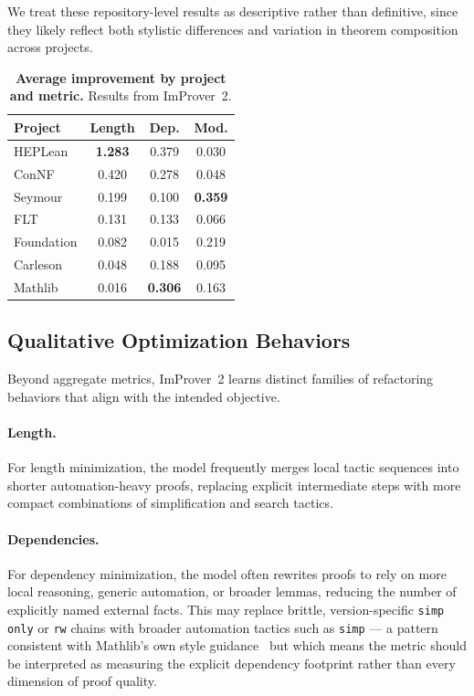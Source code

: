 We treat these repository-level results as descriptive rather than definitive, since they likely reflect both stylistic differences and variation in theorem composition across projects.

\begin{table}[ht]
\centering
\caption{\textbf{Average improvement by project and metric.} Results from ImProver~2.}
\label{tab:imp2_project}
\small
\begin{tabular}{l|ccc}
\toprule
\textbf{Project} & \textbf{Length} & \textbf{Dep.} & \textbf{Mod.} \\
\midrule
HEPLean    & \textbf{1.283} & 0.379 & 0.030 \\
ConNF      & 0.420 & 0.278 & 0.048 \\
Seymour    & 0.199 & 0.100 & \textbf{0.359} \\
FLT        & 0.131 & 0.133 & 0.066 \\
Foundation & 0.082 & 0.015 & 0.219 \\
Carleson   & 0.048 & 0.188 & 0.095 \\
Mathlib    & 0.016 & \textbf{0.306} & 0.163 \\
\bottomrule
\end{tabular}
\end{table}


\subsection{Qualitative Optimization Behaviors}
\label{sec:imp2_qual}

Beyond aggregate metrics, ImProver~2 learns distinct families of refactoring behaviors that align with the intended objective.

\paragraph{Length.} For length minimization, the model frequently merges local tactic sequences into shorter automation-heavy proofs, replacing explicit intermediate steps with more compact combinations of simplification and search tactics.

\paragraph{Dependencies.} For dependency minimization, the model often rewrites proofs to rely on more local reasoning, generic automation, or broader lemmas, reducing the number of explicitly named external facts. This may replace brittle, version-specific \texttt{simp only} or \texttt{rw} chains with broader automation tactics such as \texttt{simp} --- a pattern consistent with Mathlib's own style guidance~\cite{lean_style_guide} but which means the metric should be interpreted as measuring the explicit dependency footprint rather than every dimension of proof quality.

